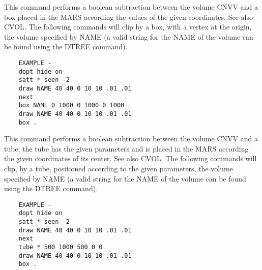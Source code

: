    \par
This command performs a boolean subtraction between the volume CNVV and a 
   box placed in the MARS according the values of the given coordinates. See 
   also CVOL.  The following commands will clip by a box, with a vertex at the 
   origin, the volume specified by NAME (a valid string for the NAME of the 
   volume can be found using the DTREE command).  
\begin{verbatim}
    EXAMPLE -
    dopt hide on
    satt * seen -2
    draw NAME 40 40 0 10 10 .01 .01
    next
    box NAME 0 1000 0 1000 0 1000
    draw NAME 40 40 0 10 10 .01 .01
    box .
\end{verbatim}

\ENDCMD


\BEGARG
{}
\ENDARG

   \par
This command performs a boolean subtraction between the volume CNVV and a 
   tube; the tube has the given parameters and is placed in the MARS according 
   the given coordinates of its center.  See also CVOL.  The following 
   commands will clip, by a tube, positioned according to the given 
   parameters, the volume specified by NAME (a valid string for the NAME of 
   the volume can be found using the DTREE command).  
\begin{verbatim}
    EXAMPLE -
    dopt hide on
    satt * seen -2
    draw NAME 40 40 0 10 10 .01 .01
    next
    tube * 500 1000 500 0 0
    draw NAME 40 40 0 10 10 .01 .01
    box .
\end{verbatim}

\ENDCMD


\BEGARG
{}
\ENDARG

